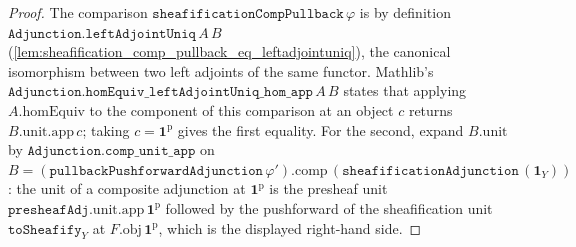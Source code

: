 \begin{proof}
  \leanok
  The comparison \(\mathtt{sheafificationCompPullback}\,\varphi\) is by definition
  \(\mathtt{Adjunction.leftAdjointUniq}\,A\,B\)
  (\cref{lem:sheafification_comp_pullback_eq_leftadjointuniq}), the canonical isomorphism between two left
  adjoints of the same functor. Mathlib's
  \(\mathtt{Adjunction.homEquiv\_leftAdjointUniq\_hom\_app}\,A\,B\) states that applying
  \(A.\mathrm{homEquiv}\) to the component of this comparison at an object \(c\) returns
  \(B.\mathrm{unit}.\mathrm{app}\,c\); taking \(c = \mathbf{1}^{\mathrm{p}}\) gives the first
  equality. For the second, expand \(B.\mathrm{unit}\) by
  \(\mathtt{Adjunction.comp\_unit\_app}\) on \(B = (\mathtt{pullbackPushforwardAdjunction}\,
  \varphi').\mathrm{comp}\,(\mathtt{sheafificationAdjunction}\,(\mathbf{1}_Y))\): the unit of a
  composite adjunction at \(\mathbf{1}^{\mathrm{p}}\) is the presheaf unit
  \(\mathtt{presheafAdj}.\mathrm{unit}.\mathrm{app}\,\mathbf{1}^{\mathrm{p}}\) followed by the
  pushforward of the sheafification unit \(\mathtt{toSheafify}_Y\) at
  \(F.\mathrm{obj}\,\mathbf{1}^{\mathrm{p}}\), which is the displayed right-hand side.
\end{proof}

